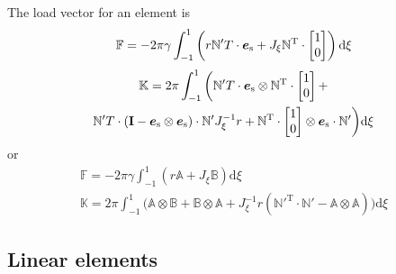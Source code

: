 \documentclass[a4paper,11pt]{article}
\newcommand{\ta}[1]{\text{\boldmath $#1$}} %
\newcommand{\ts}[1]{\text{\boldmath $\mathrm{#1}$}} %
\newcommand{\uv}[1]{\mathbb{#1}}
\newcommand{\um}[1]{\mathbb{#1}}
\newcommand{\dif}[1]{\mathrm{d}#1}
\newcommand{\T}{\mathrm{T}}
\newcommand{\surf}{\mathrm{s}}
\DeclareMathOperator{\sign}{sign}
\begin{document}
The load vector for an element is
\begin{gather}
 \uv F = -2\pi \gamma \int_{-1}^{1} \left(r{\um N}'^\T\cdot\ta e_\surf + J_\xi{\um N}^\T\cdot\begin{bmatrix}1\\0\end{bmatrix}\right) \dif\xi
\end{gather}
\begin{multline}
 \um K = 2\pi \int_{-1}^{1} \bigg(
	{\um N}'^\T \cdot \ta e_\surf \otimes {\um N}^\T\cdot \begin{bmatrix}1\\0\end{bmatrix} +\\
	{\um N}'^\T \cdot (\ts I - \ta e_\surf\otimes \ta e_\surf)\cdot {\um N}' J_\xi^{-1} r +
	{\um N}^\T \cdot \begin{bmatrix}1\\0\end{bmatrix}\otimes \ta e_\surf\cdot {\um N}'
	\bigg)\dif\xi
\end{multline}
or
\begin{gather}
  \uv F = -2\pi \gamma \int_{-1}^{1} \left(r\uv A + J_\xi\uv B\right) \dif\xi\\
  \um K = 2\pi \int_{-1}^{1} \bigg(
	\uv A \otimes \uv B +
	\uv B\otimes \uv A +
	J_\xi^{-1} r({\um N}'^\T \cdot {\um N}' - \uv A\otimes \uv A)
	\bigg)\dif\xi
\end{gather}

\subsection{Linear elements}
\end{document}
